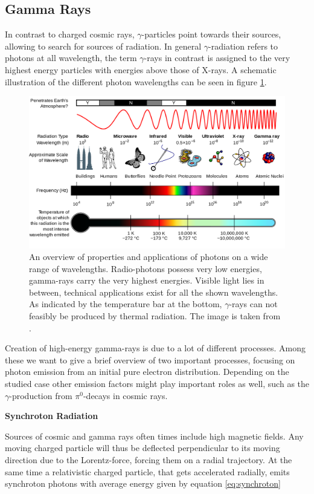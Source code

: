 \subsection{Gamma Rays}
In contrast to charged cosmic rays, $\gamma$-particles point towards
their sources, allowing to search for sources of radiation.
In general $\gamma$-radiation refers to photons at all wavelength,
the term $\gamma$-rays in contrast is assigned to the very 
highest energy particles with energies above those of X-rays.
A schematic illustration of the different photon wavelengths
can be seen in figure \ref{fig:em_spectrum}.

\begin{figure}
	\centering
	\captionsetup{width=0.9\linewidth}
	\includegraphics[width=.9\textwidth]{images/em_spectrum.png}
	\caption{An overview of properties and applications of photons
		on a wide range of wavelengths.
		Radio-photons possess very low energies, gamma-rays 
		carry the very highest energies.
		Visible light lies in between, technical 
		applications exist for all the shown wavelengths.
		As indicated by the temperature bar at the bottom,
		$\gamma$-rays can not feasibly be produced by thermal radiation.
		The image is taken from \cite{wiki_em}.}
	\label{fig:em_spectrum}
\end{figure}

Creation of high-energy gamma-rays is due to a lot of 
different processes. Among these we want to give a brief 
overview of two important processes, focusing on 
photon emission from an initial pure electron distribution.
Depending on the studied case other emission factors 
might play important roles as well, such as 
the $\gamma$-production from $\pi^0$-decays in cosmic rays.

\textbf{Synchroton Radiation}

Sources of cosmic and gamma rays often times include 
high magnetic fields. Any moving charged particle will thus be
deflected perpendicular to its moving direction
due to the Lorentz-force, forcing them on a radial trajectory.
At the same time a relativistic charged particle, 
that gets accelerated radially, emits synchroton 
photons with average energy given by 
equation \ref{eq:synchroton}

